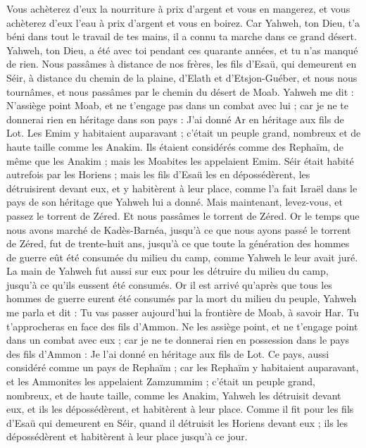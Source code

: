 \begin{multicols}{2}
Vous achèterez d'eux la nourriture à prix d'argent et vous en mangerez, et vous achèterez d'eux l'eau à prix d'argent et vous en boirez.
Car Yahweh, ton Dieu, t'a béni dans tout le travail de tes mains, il a connu ta marche dans ce grand désert. Yahweh, ton Dieu, a été avec toi pendant ces quarante années, et tu n'as manqué de rien.
Nous passâmes à distance de nos frères, les fils d'Esaü, qui demeurent en Séir, à distance du chemin de la plaine, d'Elath et d'Etsjon-Guéber, et nous nous tournâmes, et nous passâmes par le chemin du désert de Moab.
Yahweh me dit : N'assiège point Moab, et ne t'engage pas dans un combat avec lui ; car je ne te donnerai rien en héritage dans son pays : J'ai donné Ar en héritage aux fils de Lot.
Les Emim y habitaient auparavant ; c'était un peuple grand, nombreux et de haute taille comme les Anakim.
Ils étaient considérés comme des Rephaïm, de même que les Anakim ; mais les Moabites les appelaient Emim.
Séir était habité autrefois par les Horiens ; mais les fils d'Esaü les en dépossédèrent, les détruisirent devant eux, et y habitèrent à leur place, comme l'a fait Israël dans le pays de son héritage que Yahweh lui a donné.
Mais maintenant, levez-vous, et passez le torrent de Zéred. Et nous passâmes le torrent de Zéred.
Or le temps que nous avons marché de Kadès-Barnéa, jusqu'à ce que nous ayons passé le torrent de Zéred, fut de trente-huit ans, jusqu'à ce que toute la génération des hommes de guerre eût été consumée du milieu du camp, comme Yahweh le leur avait juré.
La main de Yahweh fut aussi sur eux pour les détruire du milieu du camp, jusqu'à ce qu'ils eussent été consumés.
Or il est arrivé qu'après que tous les hommes de guerre eurent été consumés par la mort du milieu du peuple,
Yahweh me parla et dit :
Tu vas passer aujourd'hui la frontière de Moab, à savoir Har.
Tu t'approcheras en face des fils d'Ammon. Ne les assiège point, et ne t'engage point dans un combat avec eux ; car je ne te donnerai rien en possession dans le pays des fils d'Ammon : Je l'ai donné en héritage aux fils de Lot.
 Ce pays, aussi considéré comme un pays de Rephaïm ; car les Rephaïm y habitaient auparavant, et les Ammonites les appelaient Zamzummim ;
c'était un peuple grand, nombreux, et de haute taille, comme les Anakim, Yahweh les détruisit devant eux, et ils les dépossédèrent, et habitèrent à leur place.
Comme il fit pour les fils d'Esaü qui demeurent en Séir, quand il détruisit les Horiens devant eux ; ils les dépossédèrent et habitèrent à leur place jusqu'à ce jour.

\end{multicols}
